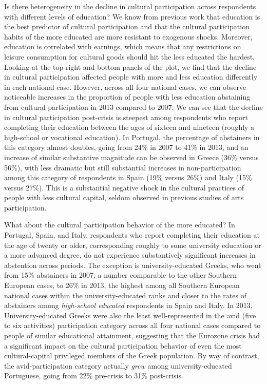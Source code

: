 \documentclass{article}
\begin{document}
Is there heterogeneity in the decline in cultural participation across respondents with different levels of education? We know from previous work that education is the best predictor of cultural participation and that the cultural participation habits of the more educated are more resistant to exogenous shocks. Moreover, education is correlated with earnings, which means that any restrictions on leisure consumption for cultural goods should hit the less educated the hardest. Looking at the top-right and bottom panels of the plot, we find that the decline in cultural participation affected people with more and less education differently in each national case. However, across all four national cases, we can observe noticeable increases in the proportion of people with less education abstaining from cultural participation in 2013 compared to 2007.  We can see that the decline in cultural participation post-crisis is steepest among respondents who report completing their education between the ages of sixteen and nineteen (roughly a high-school or vocational education). In Portugal, the percentage of abstainers in this category almost doubles, going from 24\% in 2007 to 41\% in 2013, and an increase of similar substantive magnitude can be observed in Greece (36\% versus 56\%), with less dramatic but still substantial increases in non-participation among this category of respondents in Spain (19\% versus 26\%) and Italy (15\% versus 27\%). This is a substantial negative shock in the cultural practices of people with less cultural capital, seldom observed in previous studies of arts participation.

What about the cultural participation behavior of the more educated? In Portugal, Spain, and Italy, respondents who report completing their education at the age of twenty or older, corresponding roughly to some university education or a more advanced degree, do not experience substantively significant increases in abstention across periods. The exception is university-educated Greeks, who went from 15\% abstainers in 2007, a number comparable to the other Southern European cases, to 26\% in 2013, the highest among all Southern European national cases within the university-educated ranks and closer to the rates of abstainers among \textit{high-school educated} respondents in Spain and Italy. In 2013, University-educated Greeks were also the least well-represented in the avid (five to six activities) participation category across all four national cases compared to people of similar educational attainment, suggesting that the Eurozone crisis had a significant impact on the cultural participation behavior of even the most cultural-capital privileged members of the Greek population. By way of contrast, the avid-participation category actually \textit{grew} among university-educated Portuguese, going from 22\% pre-crisis to 31\% post-crisis.
\end{document}
